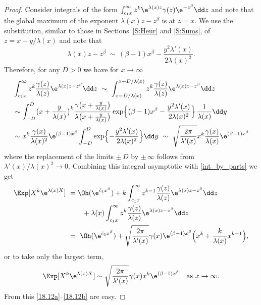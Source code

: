 \begin{proof}
	Consider integrals of the form $\int_{c_1x}^\infty z^k \e^{\lambda(x)z} \gamma(z) \e^{-z^\beta} \dd z$ and note that the global maximum of the exponent $\lambda(x)z- z^\beta$ is at $z=x$.
	We use the substitution, similar to those in Sections~\ref{S:Heur} and \ref{S:Sums}, of $z=x+ y/\lambda(x)$ and note that
	\[\lambda(x) z-z^\beta\ \sim \ (\beta-1)x^\beta-\frac{y^2\lambda'(x)}{2\lambda(x)^2}.\]
	Therefore, for any $D > 0$ we have for $x \to \infty$
	\begin{align*}
		& \int_{c_1x}^\infty z^k \frac{\gamma(z)}{\lambda(z)} \e^{\lambda(x) z- z^\beta} \dd z \
	  	\sim\ \int_{x- D/\lambda(x)}^{x+ D/\lambda(x)} z^k \frac{\gamma(z)}{\lambda(z)} \e^{\lambda(x) z- z^\beta} \dd z \\
		&\sim \int_{-D}^D  \bigl(x+ \frac{y}{\lambda(x)}\bigr)^k
		\frac{\gamma\big(x+ \frac{y}{\lambda(x)}\bigr)}{\lambda\big(x+ \frac{y}{\lambda(x)}\bigr)}
		\exp\Bigl\{ (\beta-1)x^\beta-\frac{y^2\lambda'(x)}{2\lambda(x)^2} \Bigr\}\,\frac{1}{\lambda(x)}  \dd y\\
		&\sim x^k \frac{\gamma(x)}{\lambda(x)^2}\e^{(\beta-1)x^\beta}\int_{-D}^D
		\exp\Bigl\{ {-}\frac{y^2\lambda'(x)}{2\lambda(x)^2} \Bigr\}\dd y\
		\sim \ \sqrt{\frac{2 \pi}{\lambda'(x)}} x^k \frac{\gamma(x)}{\lambda(x)} \e^{(\beta-1)x^\beta}
	\end{align*}
	where the replacement of the limits $\pm\, D$ by $\pm\,\infty$ follows from  $\lambda'(x)/\lambda(x)^2\to 0$.
	Combining this integral asymptotic with \eqref{int_by_parts}  we get
	\begin{align}
	\Exp[X^k \e^{\lambda(x) X}]\
	&= \Oh(\e^{ \tilde c_1 x ^\beta})
	+ k \int_{c_1x}^\infty z^{k-1} \frac{\gamma(z)}{\lambda(z)} \e^{\lambda(x)z - z^\beta}  \dd z
	\\ &\qquad + \lambda(x) \int_{c_1x}^\infty z^k \frac{\gamma(z)}{\lambda(z)} \e^{\lambda(x)z - z^\beta}  \dd z \notag \\
	&=\ \Oh(\e^{ \tilde c_1 x ^\beta}) +
	\sqrt{\frac{2 \pi}{\lambda'(x)}} \gamma(x) \e^{(\beta-1)x^\beta} \Bigl( x^k + \frac{k}{\lambda(x)} x^{k-1}  \Bigr), \label{derivs_of_mgf}
	\end{align}
	or to take only the largest term,
	\[
	 	\Exp[X^k \e^{\lambda(x) X}] \sim
	 	\sqrt{\frac{2\pi}{\lambda'(x)} } \gamma(x) x^k \e^{(\beta-1)x^\beta} \quad \text{as } x \to \infty.
	 \]
	From this \eqref{18.12a}--\eqref{18.12b} are easy.


\end{proof}
